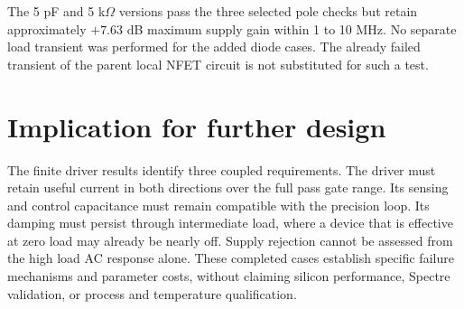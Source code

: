The 5 pF and 5 k$\Omega$ versions pass the three selected pole checks but retain approximately $+7.63$ dB maximum supply gain within 1 to 10 MHz. No separate load transient was performed for the added diode cases. The already failed transient of the parent local NFET circuit is not substituted for such a test.

\section{Implication for further design}
The finite driver results identify three coupled requirements. The driver must retain useful current in both directions over the full pass gate range. Its sensing and control capacitance must remain compatible with the precision loop. Its damping must persist through intermediate load, where a device that is effective at zero load may already be nearly off. Supply rejection cannot be assessed from the high load AC response alone. These completed cases establish specific failure mechanisms and parameter costs, without claiming silicon performance, Spectre validation, or process and temperature qualification.
